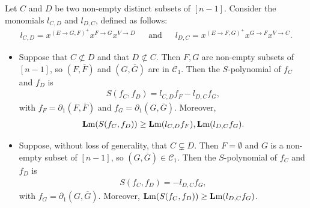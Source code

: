 \documentclass[ALCO]{cedram}
\newcommand{\lm}{\mbox{${\bf L}{\rm m}$}}
\newcommand{\mcc}{\mbox{$\mathcal{C}$}}
\newcommand{\dif}{\mbox{$\partial$}}
\begin{document}
\begin{lemma}\label{s-poly}
Let $C$ and $D$ be two non-empty distinct subsets of $[n-1]$. Consider
the monomials $l_{C,D}$ and $l_{D,C}$, defined as follows:
\begin{eqnarray*}
l_{C,D}=x^{(E\to G,F)^{+}}x^{F\to G}x^{V\to D}\phantom{+}\mbox{ and }\phantom{+}
l_{D,C}=x^{(E\to F,G)^{+}}x^{G\to F}x^{V\to C}.
\end{eqnarray*}
\begin{itemize}
\item[$(a)$] Suppose that $C\not\subset D$ and that $D\not\subset
  C$. Then $F,G$ are non-empty subsets of $[n-1]$, so
  $(F,\overline{F})$ and $(G,\overline{G})$ are in $\mcc_1$. Then the
  $S$-polynomial of $f_C$ and $f_D$ is
\begin{eqnarray}\label{sfcfd}
S(f_C,f_D)=l_{C,D}f_F-l_{D,C}f_G,
\end{eqnarray}
with $f_F=\dif_1(F,\overline{F})$ and
$f_G=\dif_1(G,\overline{G})$. Moreover,
\begin{eqnarray*}
\lm(S(f_C,f_D))\geq\lm(l_{C,D}f_F),\lm(l_{D,C}f_G).
\end{eqnarray*}
\item[$(b)$] Suppose, without loss of generality, that $C\subsetneq
  D$. Then $F=\emptyset$ and $G$ is a non-empty subset of $[n-1]$, so
  $(G,\overline{G})\in\mcc_1$. Then the $S$-polynomial of $f_C$ and
  $f_D$ is
\begin{eqnarray}\label{sfcfd0}
S(f_C,f_D)=-l_{D,C}f_G, 
\end{eqnarray}
with $f_G=\dif_1(G,\overline{G})$.  Moreover,
$\lm(S(f_C,f_D))\geq\lm(l_{D,C}f_G)$.
\end{itemize}
\end{lemma}
\end{document}
